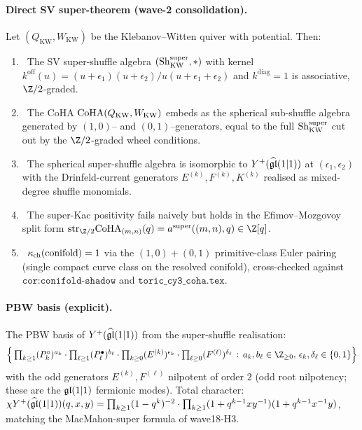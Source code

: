 \paragraph{Direct SV super-theorem (wave-2 consolidation).}
\begin{theorem}
\label{thm:wave2-agent15-sv-conifold-super}
Let $(Q_{\mathrm{KW}}, W_{\mathrm{KW}})$ be the Klebanov--Witten quiver
with potential. Then:
\begin{enumerate}
  \item\ClaimStatusTheorem\ The SV super-shuffle algebra
  $(\mathrm{Sh}^{\mathrm{super}}_{\mathrm{KW}}, \ast)$ with kernel
  $k^{\mathrm{off}}(u)=(u+\epsilon_1)(u+\epsilon_2)/u(u+\epsilon_1+
  \epsilon_2)$ and $k^{\mathrm{diag}}=1$ is associative, $\Z/2$-graded.
  \item\ClaimStatusTheorem\ The CoHA $\mathrm{CoHA}(Q_{\mathrm{KW}},
  W_{\mathrm{KW}})$ embeds as the spherical sub-shuffle algebra
  generated by $(1,0)$-- and $(0,1)$--generators, equal to the full
  $\mathrm{Sh}^{\mathrm{super}}_{\mathrm{KW}}$ cut out by the $\Z/2$-graded wheel
  conditions.
  \item\ClaimStatusTheorem\ The spherical super-shuffle algebra is
  isomorphic to $Y^+(\widehat{\mathfrak{gl}}(1|1))$ at $(\epsilon_1, \epsilon_2)$
  with the Drinfeld-current generators $E^{(k)}, F^{(k)}, K^{(k)}$
  realised as mixed-degree shuffle monomials.
  \item\ClaimStatusVerified\ The super-Kac positivity fails naively
  but holds in the Efimov--Mozgovoy split form
  $\mathrm{str}_{\Z/2}\CoHA_{(m,n)}(q) = a^{\mathrm{super}}((m,n), q)
  \in \Z[q]$.
  \item\ClaimStatusTheorem\ $\kappa_{\mathrm{ch}}(\mathrm{conifold}) = 1$ via the
  $(1,0) + (0,1)$ primitive-class Euler pairing (single compact curve
  class on the resolved conifold), cross-checked against
  $\texttt{cor:conifold-shadow}$ and $\texttt{toric\_cy3\_coha.tex}$.
\end{enumerate}
\end{theorem}

\paragraph{PBW basis (explicit).}
The PBW basis of $Y^+(\widehat{\mathfrak{gl}}(1|1))$ from the super-shuffle
realisation:
\[
  \Bigl\{\,\textstyle\prod_{k\geq 1} (P_k^\circ)^{a_k}\cdot
   \prod_{\ell\geq 1} (P_\ell^\bullet)^{b_\ell}\cdot
   \prod_{k\geq 0}(E^{(k)})^{\epsilon_k}\cdot
   \prod_{\ell\geq 0}(F^{(\ell)})^{\delta_\ell}
  \,:\, a_k,b_\ell\in\Z_{\geq 0},\,\epsilon_k,\delta_\ell\in\{0,1\}
  \Bigr\}
\]
with the odd generators $E^{(k)}, F^{(\ell)}$ nilpotent of order $2$
(odd root nilpotency; these are the $\mathfrak{gl}(1|1)$ fermionic modes). Total
character: $\chi Y^+(\widehat{\mathfrak{gl}}(1|1))(q,x,y)=\prod_{k\geq 1}
(1-q^k)^{-2}\cdot\prod_{k\geq 1}(1+q^{k-1}xy^{-1})(1+q^{k-1}x^{-1}y)$,
matching the MacMahon-super formula of wave18-H3.

